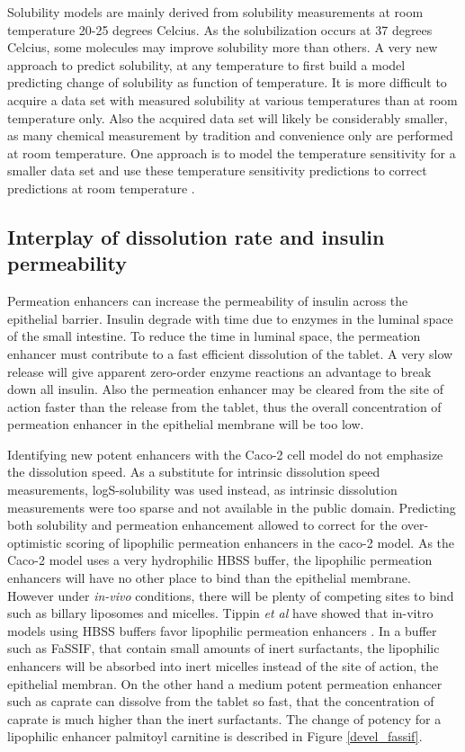 Solubility models \cite{delaney2004esol,palmer2007random} are mainly derived from solubility measurements at room temperature 20-25 degrees Celcius. As the solubilization occurs at 37 degrees Celcius, some molecules may improve solubility more than others. A very new approach to predict solubility, at any temperature to first build a model predicting change of solubility as function of temperature. It is more difficult to acquire a data set with measured solubility at various temperatures than at room temperature only. Also the acquired data set will likely be considerably smaller, as many chemical measurement by tradition and convenience only are performed at room temperature. One approach is to model the temperature sensitivity for a smaller data set and use these temperature sensitivity predictions to correct predictions at room temperature \cite{klimenko2016novel}.


\subsection{Interplay of dissolution rate and insulin permeability}
Permeation enhancers can increase the permeability of insulin across the epithelial barrier. Insulin degrade with time due to enzymes in the luminal space of the small intestine. To reduce the time in luminal space, the permeation enhancer must contribute to a fast efficient dissolution of the tablet. A very slow release will give apparent zero-order enzyme reactions an advantage to break down all insulin. Also the permeation enhancer may be cleared from the site of action faster than the release from the tablet, thus the overall concentration of permeation enhancer in the epithelial membrane will be too low.

Identifying new potent enhancers with the Caco-2 cell model do not emphasize the dissolution speed. As a substitute for intrinsic dissolution speed measurements, logS-solubility was used instead, as intrinsic dissolution measurements were too sparse and not available in the public domain. Predicting both solubility and permeation enhancement allowed to correct for the over-optimistic scoring of lipophilic permeation enhancers in the caco-2 model. As the Caco-2 model uses a very hydrophilic HBSS buffer, the lipophilic permeation enhancers will have no other place to bind than the epithelial membrane. However under \textit{in-vivo} conditions, there will be plenty of competing sites to bind such as billary liposomes and micelles. Tippin \textit{et al} have showed that in-vitro models using HBSS buffers favor lipophilic permeation enhancers \cite{tippin2008biorelevant}. In a buffer such as FaSSIF, that contain small amounts of inert surfactants, the lipophilic enhancers will be absorbed into inert micelles instead of the site of action, the epithelial membran. On the other hand a medium potent permeation enhancer such as caprate can dissolve from the tablet so fast, that the concentration of caprate is much higher than the inert surfactants. The change of potency for a lipophilic enhancer palmitoyl carnitine is described in Figure \ref{devel_fassif}.


